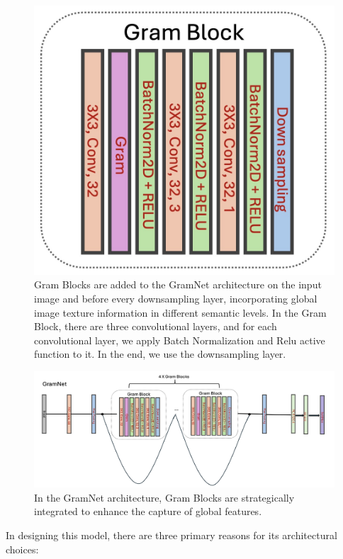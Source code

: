 \documentclass[final]{cvpr}
\begin{document}
\begin{figure}[t]
\begin{center}
   \includegraphics[width=0.8\linewidth]{images/GramBlock.jpg}
\end{center}
   \caption{Gram Blocks are added to the GramNet architecture on the input image and before every downsampling layer, incorporating global image texture information in different semantic levels. In the Gram Block, there are three convolutional layers, and for each convolutional layer, we apply Batch Normalization and Relu active function to it. In the end, we use the downsampling layer.}
\label{fig:long}
\label{fig:gramblock}
\end{figure}

\begin{figure}[t]
\begin{center}
   \includegraphics[width=0.8\linewidth]{images/GramNet.jpg}
\end{center}
   \caption{In the GramNet architecture, Gram Blocks are strategically integrated to enhance the capture of global features.}
\label{fig:long}
\label{fig:gramnet}
\end{figure}

In designing this model, there are three primary reasons for its architectural choices:  
\end{document}
